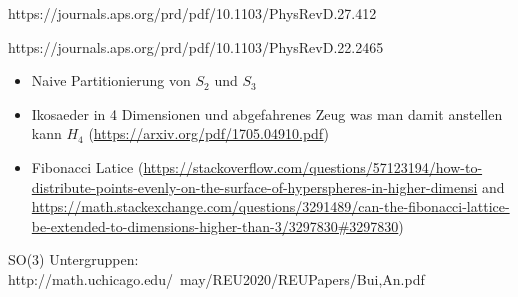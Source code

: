 https://journals.aps.org/prd/pdf/10.1103/PhysRevD.27.412

https://journals.aps.org/prd/pdf/10.1103/PhysRevD.22.2465


\begin{itemize}
 \item Naive Partitionierung von $S_2$ und $S_3$
 \item Ikosaeder in 4 Dimensionen und abgefahrenes Zeug was man damit anstellen kann $H_4$ (\url{https://arxiv.org/pdf/1705.04910.pdf})
 \item Fibonacci Latice (\url{https://stackoverflow.com/questions/57123194/how-to-distribute-points-evenly-on-the-surface-of-hyperspheres-in-higher-dimensi} and \url{https://math.stackexchange.com/questions/3291489/can-the-fibonacci-lattice-be-extended-to-dimensions-higher-than-3/3297830#3297830})
\end{itemize}
SO(3) Untergruppen: http://math.uchicago.edu/~may/REU2020/REUPapers/Bui,An.pdf
